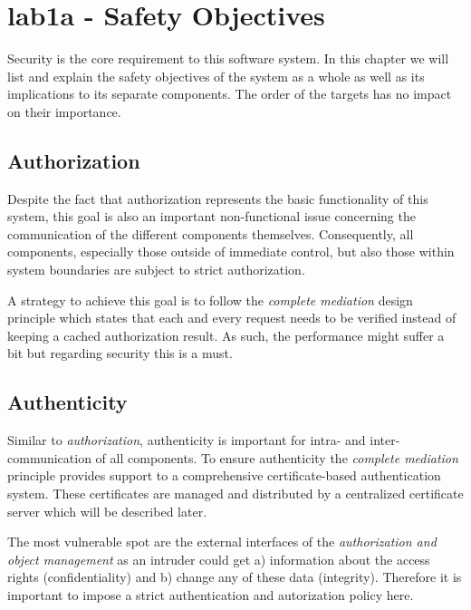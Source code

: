 \documentclass[12pt,a4paper,titlepage,oneside]{scrartcl}
\begin{document}
\maketitle
\setcounter{section}{0}
\setcounter{tocdepth}{2}
\tableofcontents

%
%

\section{lab1a - Safety Objectives}
Security is the core requirement to this software system. In this chapter we will list and explain the
safety objectives of the system as a whole as well as its implications to its separate components. The order
of the targets has no impact on their importance.


\subsection{Authorization}
Despite the fact that authorization represents the basic functionality of this system, this goal is also
an important non-functional issue concerning the communication of the different components themselves. Consequently, all components,
especially those outside of immediate control, but also those within system boundaries are subject to strict authorization.

A strategy to achieve this goal is to follow the \emph{complete mediation} design principle which states that each and
every request needs to be verified instead of keeping a cached authorization result. As such, the performance might suffer
a bit but regarding security this is a must.


\subsection{Authenticity}
Similar to \emph{authorization}, authenticity is important for intra- and inter-communication of all components. To
ensure authenticity the \emph{complete mediation} principle provides support to a comprehensive certificate-based authentication
system. These certificates are managed and distributed by a centralized certificate server which will be described later.

The most vulnerable spot are the external interfaces of the \emph{authorization and object management} as an intruder could get
a) information about the access rights (confidentiality) and b) change any of these data (integrity). Therefore it is important to impose
a strict authentication and autorization policy here.
\end{document}
